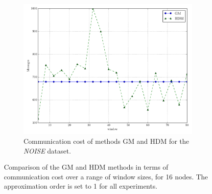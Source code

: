 \begin{figure}[!h]
\begin{subfigure}{0.32\textwidth}%
  \includegraphics[width=\linewidth]{img/main_msg_noisyinterweaving_window.pdf}
  \caption{Communication cost of methods GM and HDM for the \emph{NOISE} dataset.}
\end{subfigure}
\vspace{0.5cm}
\caption{Comparison of the GM and HDM methods in terms of communication cost over a range of window sizes, for 16 nodes. The approximation order is set to 1 for all experiments.} \label{fig:mainComp-wl}
\end{figure}

